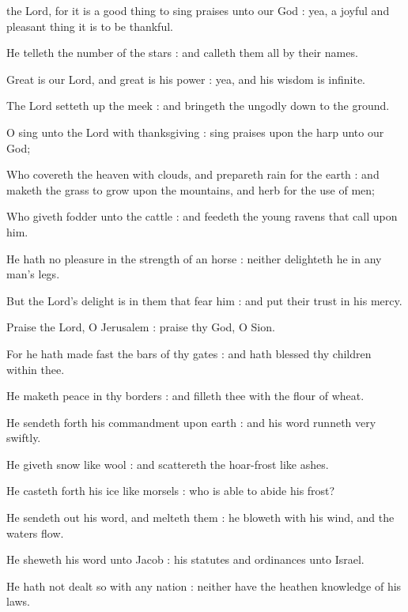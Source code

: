  the Lord, for it is a good thing to sing praises unto our God : yea, a joyful and pleasant thing it is to be thankful.\par
{}
He telleth the number of the stars : and calleth them all by their names.\par
{}Great is our Lord, and great is his power : yea, and his wisdom is infinite.\par
{}The Lord setteth up the meek : and bringeth the ungodly down to the ground.\par
{}O sing unto the Lord with thanksgiving : sing praises upon the harp unto our God;\par
{}Who covereth the heaven with clouds, and prepareth rain for the earth : and maketh the grass to grow upon the mountains, and herb for the use of men;\par
{}Who giveth fodder unto the cattle : and feedeth the young ravens that call upon him.\par
{}He hath no pleasure in the strength of an horse : neither delighteth he in any man's legs.\par
{}But the Lord's delight is in them that fear him : and put their trust in his mercy.\par
{}Praise the Lord, O Jerusalem : praise thy God, O Sion.\par
{}For he hath made fast the bars of thy gates : and hath blessed thy children within thee.\par
{}He maketh peace in thy borders : and filleth thee with the flour of wheat.\par
{}He sendeth forth his commandment upon earth : and his word runneth very swiftly.\par
{}He giveth snow like wool : and scattereth the hoar-frost like ashes.\par
{}He casteth forth his ice like morsels : who is able to abide his frost?\par
{}He sendeth out his word, and melteth them : he bloweth with his wind, and the waters flow.\par
{}He sheweth his word unto Jacob : his statutes and ordinances unto Israel.\par
{}He hath not dealt so with any nation : neither have the heathen knowledge of his laws.\par

